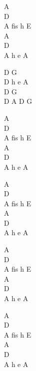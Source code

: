 \begin{chord}
    A\\
    D\\
    A fis h E\\
    A\\
    D\\
    A h e A

    D G\\
    D h e A\\
    D G\\
    D A D G

    A\\
    D\\
    A fis h E\\
    A\\
    D\\
    A h e A

    A\\
    D\\
    A fis h E\\
    A\\
    D\\
    A h e A

    A\\
    D\\
    A fis h E\\
    A\\
    D\\
    A h e A

    A\\
    D\\
    A fis h E\\
    A\\
    D\\
    A h e A
\end{chord}